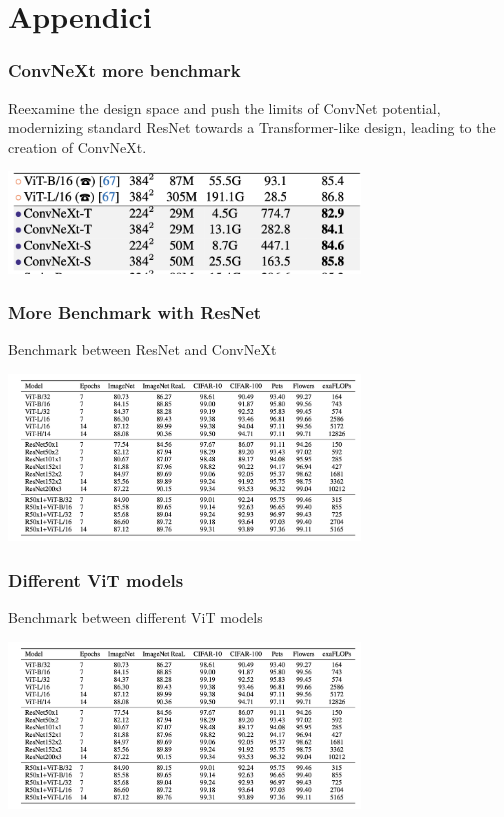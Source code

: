 \section{Appendici}

\begin{frame}
\frametitle{ConvNeXt more benchmark}
Reexamine the design space and push the limits of ConvNet potential, modernizing  standard ResNet towards a Transformer-like design, leading to the creation of ConvNeXt.

\begin{center}
    \includegraphics[width=0.7\textwidth]{img/4-section/ConvNext2.png}
\end{center}

\end{frame}


\begin{frame}
\frametitle{More Benchmark with ResNet}
Benchmark between ResNet and ConvNeXt
\begin{center}
    \includegraphics[width=0.7\textwidth]{img/4-section/More-benchmark.png}
\end{center}

\end{frame}

\begin{frame}
    \frametitle{Different ViT models}
    Benchmark between different ViT models
    \begin{center}
        \includegraphics[width=0.7\textwidth]{img/4-section/More-benchmark.png}
    \end{center}
    
    \end{frame}